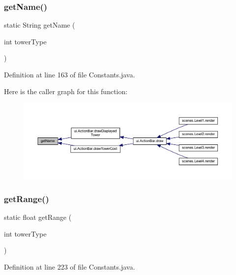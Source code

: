 \subsubsection{\texorpdfstring{get\+Name()}{getName()}}
{\footnotesize\ttfamily static String get\+Name (\begin{DoxyParamCaption}\item[{int}]{tower\+Type }\end{DoxyParamCaption})\hspace{0.3cm}{\ttfamily [static]}}



Definition at line 163 of file Constants.\+java.

Here is the caller graph for this function\+:\nopagebreak
\begin{figure}[H]
\begin{center}
\leavevmode
\includegraphics[width=350pt]{classhelpz_1_1_constants_1_1_towers_a514d43d9440f939e8a4d021a01049424_icgraph}
\end{center}
\end{figure}
\mbox{\label{classhelpz_1_1_constants_1_1_towers_add957f88d7d8a05be491699abca0ee95}} 
\subsubsection{\texorpdfstring{get\+Range()}{getRange()}}
{\footnotesize\ttfamily static float get\+Range (\begin{DoxyParamCaption}\item[{int}]{tower\+Type }\end{DoxyParamCaption})\hspace{0.3cm}{\ttfamily [static]}}



Definition at line 223 of file Constants.\+java.

